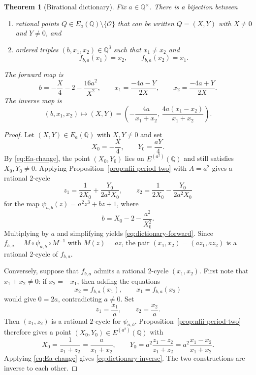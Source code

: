\documentclass[11pt,a4paper]{amsart}
\newtheorem{theorem}{Theorem}[section]
\theoremstyle{definition}
\theoremstyle{remark}
\numberwithin{equation}{section}
\newcommand{\Q}{\mathbb{Q}}
\begin{document}
\begin{theorem}[Birational dictionary]\label{thm:dictionary}
Fix $a\in\Q^\times$. There is a bijection between
\begin{enumerate}[label=\textup{(\arabic*)},leftmargin=*]
\item rational points $Q\in E_a(\Q)\setminus\{\mathcal O\}$ that can be written $Q=(X,Y)$ with $X\neq 0$ and $Y\neq 0$, and
\item ordered triples $(b,x_1,x_2)\in\Q^3$ such that $x_1\neq x_2$ and
\[
f_{b,a}(x_1)=x_2,\qquad f_{b,a}(x_2)=x_1.
\]
\end{enumerate}
The forward map is
\begin{equation}\label{eq:dictionary-forward}
b=-\frac{X}{4}-2-\frac{16a^2}{X^2},\qquad
x_1=\frac{-4a-Y}{2X},\qquad
x_2=\frac{-4a+Y}{2X}.
\end{equation}
The inverse map is
\begin{equation}\label{eq:dictionary-inverse}
(b,x_1,x_2)\longmapsto \left(X,Y\right)=\left(-\frac{4a}{x_1+x_2},\,\frac{4a(x_1-x_2)}{x_1+x_2}\right).
\end{equation}
\end{theorem}

\begin{proof}
Let $(X,Y)\in E_a(\Q)$ with $X,Y\neq 0$ and set
\[
X_0=-\frac{X}{4},\qquad Y_0=\frac{aY}{4}.
\]
By \eqref{eq:Ea-change}, the point $(X_0,Y_0)$ lies on $E^{(a^2)}(\Q)$ and still satisfies $X_0,Y_0\neq 0$. Applying Proposition~\ref{prop:nfii-period-two} with $A=a^2$ gives a rational $2$-cycle
\[
z_1=\frac{1}{2X_0}+\frac{Y_0}{2a^2X_0},\qquad
z_2=\frac{1}{2X_0}-\frac{Y_0}{2a^2X_0}
\]
for the map $\psi_{a,b}(z)=a^2z^3+bz+1$, where
\[
b=X_0-2-\frac{a^2}{X_0^2}.
\]
Multiplying by $a$ and simplifying yields \eqref{eq:dictionary-forward}. Since $f_{b,a}=M\circ \psi_{a,b}\circ M^{-1}$ with $M(z)=az$, the pair $(x_1,x_2)=(az_1,az_2)$ is a rational $2$-cycle of $f_{b,a}$.

Conversely, suppose that $f_{b,a}$ admits a rational $2$-cycle $(x_1,x_2)$. First note that \(x_1+x_2\neq0\): if \(x_2=-x_1\), then adding the equations
\[
x_2=f_{b,a}(x_1),\qquad x_1=f_{b,a}(x_2)
\]
would give \(0=2a\), contradicting \(a\neq0\). Set
\[
z_1=\frac{x_1}{a},\qquad z_2=\frac{x_2}{a}.
\]
Then $(z_1,z_2)$ is a rational $2$-cycle for $\psi_{a,b}$. Proposition~\ref{prop:nfii-period-two} therefore gives a point $(X_0,Y_0)\in E^{(a^2)}(\Q)$ with
\[
X_0=\frac{1}{z_1+z_2}=\frac{a}{x_1+x_2},\qquad
Y_0=a^2\frac{z_1-z_2}{z_1+z_2}=a^2\frac{x_1-x_2}{x_1+x_2}.
\]
Applying \eqref{eq:Ea-change} gives \eqref{eq:dictionary-inverse}. The two constructions are inverse to each other.
\end{proof}
\end{document}

